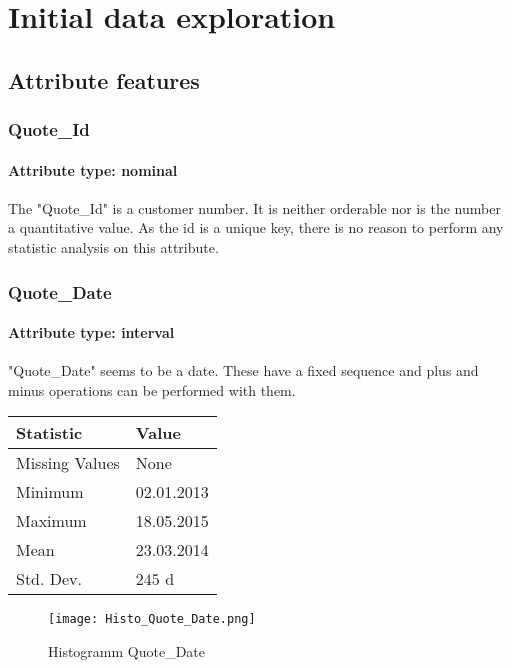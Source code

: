 
\section{Initial data exploration}
\subsection{Attribute features}
\subsubsection{Quote\_Id}
\paragraph{Attribute type: nominal}
The "Quote\_Id" is a customer number. It is neither orderable nor is the number a quantitative value. As the id is a unique key, there is no reason to perform any statistic analysis on this attribute.


\subsubsection{Quote\_Date}
\paragraph{Attribute type: interval}
"Quote\_Date" seems to be a date. These have a fixed sequence and plus and minus operations can be performed with them.
 
\begin{table}[H]
	\renewcommand{\arraystretch}{1.25}
	\begin{tabular}{l|l}
		\textbf{Statistic} & \textbf{Value}\\\hline
		Missing Values& None\\\hline
		Minimum& 02.01.2013\\\hline
		Maximum& 18.05.2015\\\hline
		Mean& 23.03.2014\\\hline
		Std. Dev.& $245$ d\\\hline
	\end{tabular}
\end{table}

\begin{figure}[H]
	\begin{center}
		\texttt{[image: Histo\_Quote\_Date.png]}
	\end{center}
	\caption{Histogramm Quote\_Date}
\end{figure}


